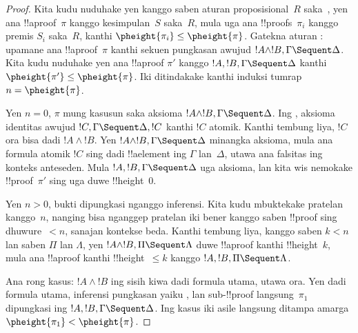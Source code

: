 \documentclass[../../../include/open-logic-section]{subfiles}
\begin{document}
\begin{proof}
Kita kudu nuduhake yen kanggo saben aturan proposisional~$R$
saka~, yen ana !!a{proof}~$\pi$ kanggo kesimpulan~$S$
saka~$R$, mula uga ana !!{proof}s~$\pi_i$ kanggo premis $S_i$
saka~$R$, kanthi $\pheight{\pi_i} \le \pheight{\pi}$.
Gatekna aturan \LeftR{\land}: upamane ana !!a{proof}~$\pi$
kanthi sekuen pungkasan awujud $!A \land !B, \Gamma \Sequent \Delta$.
Kita kudu nuduhake yen ana !!a{proof} $\pi'$ kanggo
$!A, !B, \Gamma \Sequent \Delta$ kanthi
$\pheight{\pi'} \le \pheight{\pi}$. Iki ditindakake kanthi
induksi tumrap $n = \pheight{\pi}$.

Yen $n = 0$, $\pi$ mung kasusun saka aksioma
$!A \land !B, \Gamma \Sequent \Delta$. Ing ,
aksioma identitas awujud $!C, \Gamma \Sequent \Delta, !C$
kanthi $!C$ atomik. Kanthi tembung liya, $!C$ ora bisa
dadi $!A \land !B$. Yen $!A \land !B, \Gamma \Sequent \Delta$
minangka aksioma, mula ana formula atomik $!C$ sing dadi
!!a{element} ing $\Gamma$ lan~$\Delta$, utawa ana falsitas
ing konteks anteseden. Mula $!A, !B, \Gamma \Sequent \Delta$
uga aksioma, lan kita wis nemokake !!{proof}~$\pi'$ sing
uga duwe !!{height}~$0$.

Yen $n>0$, bukti dipungkasi nganggo inferensi. Kita kudu
mbuktekake pratelan kanggo~$n$, nanging bisa nganggep pratelan
iki bener kanggo saben !!{proof} sing dhuwure~$<n$, sanajan
kontekse beda. Kanthi tembung liya, kanggo saben $k<n$ lan
saben $\Pi$ lan $\Lambda$, yen $!A \land !B, \Pi \Sequent \Lambda$
duwe !!a{proof} kanthi !!{height}~$k$, mula ana !!a{proof}
kanthi !!{height}~$\le k$ kanggo $!A, !B, \Pi \Sequent \Lambda$.

Ana rong kasus: $!A \land !B$ ing sisih kiwa dadi formula
utama, utawa ora. Yen dadi formula utama, inferensi pungkasan
yaiku \LeftR{\land}, lan sub-!!{proof} langsung~$\pi_1$
dipungkasi ing $!A, !B, \Gamma \Sequent \Delta$. Ing kasus iki
asile langsung ditampa amarga $\pheight{\pi_1} < \pheight{\pi}$.


\end{proof}
\end{document}
